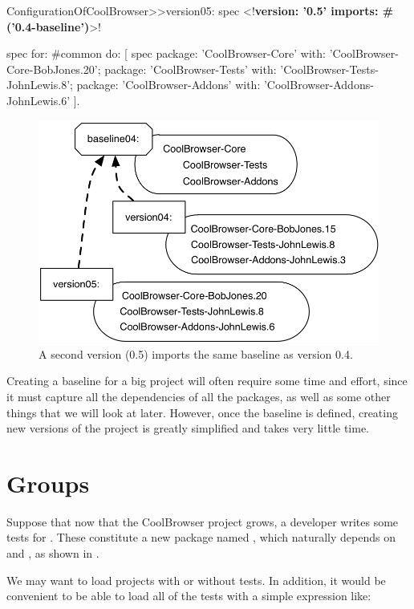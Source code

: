 \documentclass[a4paper,10pt,twoside]{book}
\begin{document}
\begin{code}{} 
ConfigurationOfCoolBrowser>>version05: spec 
       <!\textbf{version: '0.5' imports: \#('0.4-baseline')}>!
       
      spec for: #common do: [
            spec 
                  package: 'CoolBrowser-Core' with: 'CoolBrowser-Core-BobJones.20';
                  package: 'CoolBrowser-Tests' with: 'CoolBrowser-Tests-JohnLewis.8';
                  package: 'CoolBrowser-Addons' with: 'CoolBrowser-Addons-JohnLewis.6' ].
\end{code}

\begin{figure}
\begin{center}
\includegraphics[width=0.6\linewidth]{version05}
\caption{A second version (0.5) imports the same baseline as version 0.4.}\label{fig:version05}
\end{center}
\end{figure} 

Creating a baseline for a big project will often require some time and effort, since it must capture all the dependencies of all the packages, as well as some other things that we will look at later.
However, once the baseline is defined, creating new versions of the project is greatly simplified and takes very little time. 

\section{Groups}
Suppose that now that the CoolBrowser project grows, a developer writes some tests for .  These constitute a new package named , which naturally depends on  and , as shown in .

We may want to load projects with or without tests. In addition, it would be convenient to be able to load all of the tests with a simple expression like:
\end{document}

